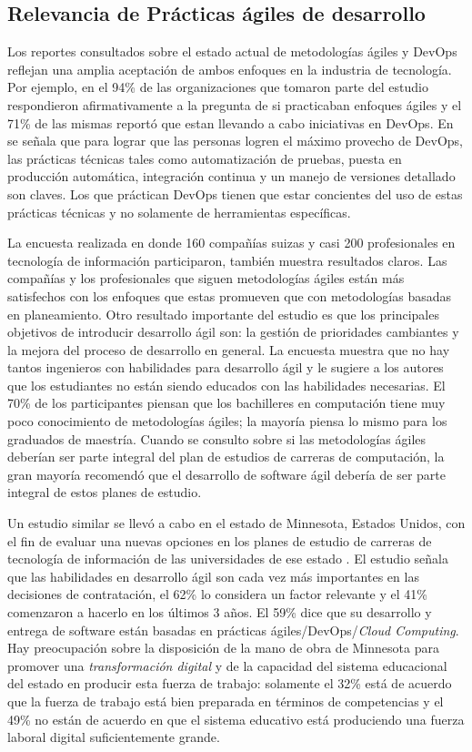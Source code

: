 \documentclass[journal]{IEEEtran}
\begin{document}
\subsection{Relevancia de Prácticas ágiles de desarrollo }
Los reportes consultados sobre el estado actual de metodologías ágiles\cite{version-one} y DevOps\cite{puppet-devops} reflejan una amplia aceptación de ambos enfoques en la industria de tecnología. Por ejemplo, en \cite{version-one} el 94\% de las organizaciones que tomaron parte del estudio respondieron afirmativamente a la pregunta de si practicaban enfoques ágiles y el 71\% de las mismas reportó que estan llevando a cabo iniciativas en DevOps. En \cite{puppet-devops} se señala que para lograr que las personas logren el máximo provecho de DevOps, las prácticas técnicas tales como automatización de pruebas, puesta en producción automática, integración continua y un manejo de versiones detallado son claves. Los que práctican DevOps tienen que estar concientes del uso de estas prácticas técnicas y no solamente de herramientas específicas. 

La encuesta realizada en \cite{kropp-meier-1} donde 160 compañías suizas y casi 200 profesionales en tecnología de información participaron, también muestra resultados claros. Las compañías y los profesionales que siguen metodologías ágiles están más satisfechos con los enfoques que estas promueven que con metodologías basadas en planeamiento. Otro resultado importante del estudio es que los principales objetivos de introducir desarrollo ágil son: la gestión de prioridades cambiantes y la mejora del proceso de desarrollo en general. La encuesta muestra que no hay tantos ingenieros con habilidades para desarrollo ágil y le sugiere a los autores que los estudiantes no están siendo educados con las habilidades necesarias. El 70\% de los participantes piensan que los bachilleres en computación tiene muy poco conocimiento de metodologías ágiles; la mayoría piensa lo mismo para los graduados de maestría. Cuando se consulto sobre si las metodologías ágiles deberían ser parte integral del plan de estudios de carreras de computación, la gran mayoría recomendó que el desarrollo de software ágil debería de ser parte integral de estos planes de estudio.

Un estudio similar se llevó a cabo en el estado de Minnesota, Estados Unidos, con el fin de evaluar una nuevas opciones en los planes de estudio de carreras de tecnología de información de las universidades de ese estado \cite{advance-it}. El estudio señala que las habilidades en desarrollo ágil son cada vez más importantes en las decisiones de contratación, el 62\% lo considera un factor relevante y el 41\% comenzaron a hacerlo en los últimos 3 años. El 59\% dice que su desarrollo y entrega de software están basadas en prácticas ágiles/DevOps/\emph{Cloud Computing}. Hay preocupación sobre la disposición de la mano de obra de Minnesota para promover una \emph{transformación digital} y de la capacidad del sistema educacional del estado en producir esta fuerza de trabajo: solamente el 32\% está de acuerdo que la fuerza de trabajo está bien preparada en términos de competencias y el 49\% no están de acuerdo en que el sistema educativo está produciendo una fuerza laboral digital suficientemente grande.
\end{document}
